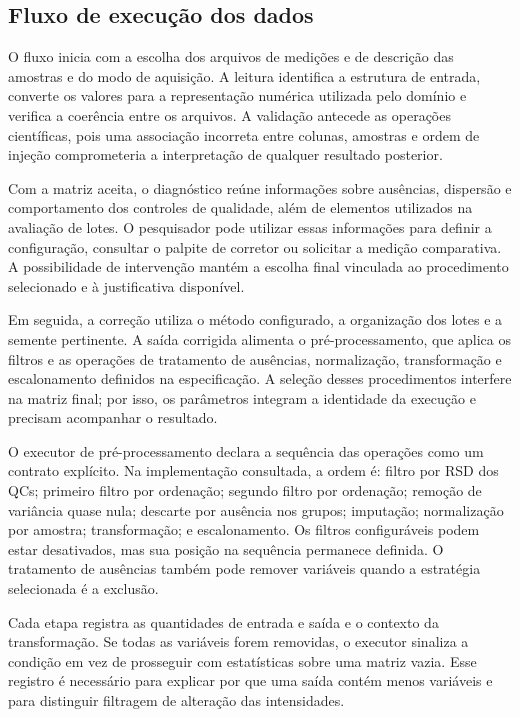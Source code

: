 \subsection{Fluxo de execução dos dados}

O fluxo inicia com a escolha dos arquivos de medições e de descrição das amostras e do modo de aquisição. A leitura identifica a estrutura de entrada, converte os valores para a representação numérica utilizada pelo domínio e verifica a coerência entre os arquivos. A validação antecede as operações científicas, pois uma associação incorreta entre colunas, amostras e ordem de injeção comprometeria a interpretação de qualquer resultado posterior.

Com a matriz aceita, o diagnóstico reúne informações sobre ausências, dispersão e comportamento dos controles de qualidade, além de elementos utilizados na avaliação de lotes. O pesquisador pode utilizar essas informações para definir a configuração, consultar o palpite de corretor ou solicitar a medição comparativa. A possibilidade de intervenção mantém a escolha final vinculada ao procedimento selecionado e à justificativa disponível.

Em seguida, a correção utiliza o método configurado, a organização dos lotes e a semente pertinente. A saída corrigida alimenta o pré-processamento, que aplica os filtros e as operações de tratamento de ausências, normalização, transformação e escalonamento definidos na especificação. A seleção desses procedimentos interfere na matriz final; por isso, os parâmetros integram a identidade da execução e precisam acompanhar o resultado.

O executor de pré-processamento declara a sequência das operações como um contrato explícito. Na implementação consultada, a ordem é: filtro por RSD dos QCs; primeiro filtro por ordenação; segundo filtro por ordenação; remoção de variância quase nula; descarte por ausência nos grupos; imputação; normalização por amostra; transformação; e escalonamento. Os filtros configuráveis podem estar desativados, mas sua posição na sequência permanece definida. O tratamento de ausências também pode remover variáveis quando a estratégia selecionada é a exclusão.

Cada etapa registra as quantidades de entrada e saída e o contexto da transformação. Se todas as variáveis forem removidas, o executor sinaliza a condição em vez de prosseguir com estatísticas sobre uma matriz vazia. Esse registro é necessário para explicar por que uma saída contém menos variáveis e para distinguir filtragem de alteração das intensidades.

